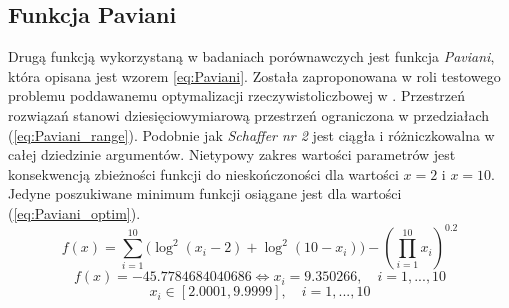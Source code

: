 \subsection{Funkcja Paviani}
\par
Drugą funkcją wykorzystaną w badaniach porównawczych jest funkcja \emph{Paviani}, która opisana jest wzorem \ref{eq:Paviani}. Została zaproponowana w roli testowego problemu poddawanemu optymalizacji rzeczywistoliczbowej w \cite{himmelblau1972applied}. Przestrzeń rozwiązań stanowi dziesięciowymiarową przestrzeń ograniczona w przedziałach (\ref{eq:Paviani_range}). Podobnie jak \emph{Schaffer nr 2} jest ciągła i różniczkowalna w całej dziedzinie argumentów. Nietypowy zakres wartości parametrów jest konsekwencją zbieżności funkcji do nieskończoności dla wartości $x=2$ i $x=10$. Jedyne poszukiwane minimum funkcji osiągane jest dla wartości (\ref{eq:Paviani_optim}).
\begin{equation}\label{eq:Paviani}
f(x)=\sum_{i=1}^{10} \bigg(\log^2(x_i-2) + \log^2(10-x_i)\bigg) - \left(
\prod_{i=1}^{10} x_i\right)^{0.2}
\end{equation}
\begin{equation} \label{eq:Paviani_optim}
f(x)=-45.7784684040686 \Leftrightarrow x_i = 9.350266,\quad i = 1, ..., 10
\end{equation}
\begin{equation} \label{eq:Paviani_range}
x_i\in[2.0001,9.9999], \quad i=1,...,10
\end{equation}

